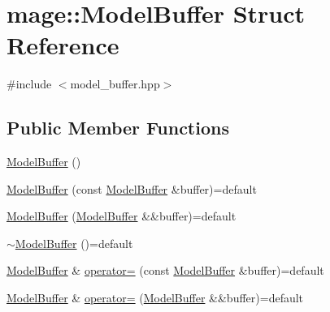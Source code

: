 \hypertarget{structmage_1_1_model_buffer}{}\section{mage\+:\+:Model\+Buffer Struct Reference}
\label{structmage_1_1_model_buffer}


{\ttfamily \#include $<$model\+\_\+buffer.\+hpp$>$}

\subsection*{Public Member Functions}
\begin{DoxyCompactItemize}
\item 
\hyperlink{structmage_1_1_model_buffer_a9069cfb6d75067b7f1509332fbec9be0}{Model\+Buffer} ()
\item 
\hyperlink{structmage_1_1_model_buffer_a593635ac135a8390b606e5e47174d2e5}{Model\+Buffer} (const \hyperlink{structmage_1_1_model_buffer}{Model\+Buffer} \&buffer)=default
\item 
\hyperlink{structmage_1_1_model_buffer_a56ec1df93cbf6505c513cf5f440fdc4f}{Model\+Buffer} (\hyperlink{structmage_1_1_model_buffer}{Model\+Buffer} \&\&buffer)=default
\item 
\hyperlink{structmage_1_1_model_buffer_a9536832e39a72cc597c41ca245eb52ba}{$\sim$\+Model\+Buffer} ()=default
\item 
\hyperlink{structmage_1_1_model_buffer}{Model\+Buffer} \& \hyperlink{structmage_1_1_model_buffer_a003f2105c63f3d7e735c1c00bab5fdee}{operator=} (const \hyperlink{structmage_1_1_model_buffer}{Model\+Buffer} \&buffer)=default
\item 
\hyperlink{structmage_1_1_model_buffer}{Model\+Buffer} \& \hyperlink{structmage_1_1_model_buffer_a2f2c8c5ec6a43c239f349e3c015320e0}{operator=} (\hyperlink{structmage_1_1_model_buffer}{Model\+Buffer} \&\&buffer)=default
\end{DoxyCompactItemize}

